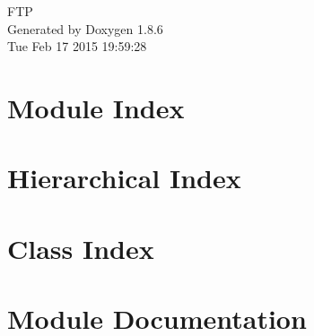 \documentclass[twoside]{book}
\newcommand{\clearemptydoublepage}{%
  \newpage{\pagestyle{empty}\cleardoublepage}%
}
\begin{document}
\hypersetup{pageanchor=false}
\begin{titlepage}
\vspace*{7cm}
\begin{center}%
{\Large F\-T\-P }\\
\vspace*{1cm}
{\large Generated by Doxygen 1.8.6}\\
\vspace*{0.5cm}
{\small Tue Feb 17 2015 19:59:28}\\
\end{center}
\end{titlepage}
\clearemptydoublepage
\tableofcontents
\clearemptydoublepage
{}
\hypersetup{pageanchor=true}

\chapter{Module Index}

\chapter{Hierarchical Index}

\chapter{Class Index}

\chapter{Module Documentation}





\end{document}
